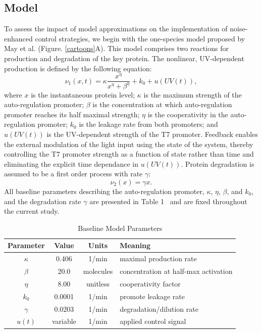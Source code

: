 \documentclass[12pt]{iopart}
\begin{document}
\subsection{Model}\label{sec:Model}
To assess the impact of model approximations on the implementation of noise-enhanced control strategies, we begin with the one-species model proposed by May et al. \cite{May2021} (Figure. \ref{cartoons}A). 
This model comprises two reactions for production and degradation of the key protein. 
The nonlinear, UV-dependent production is defined by the following equation:
\begin{equation}
\nu_1(x,t)= \kappa\frac{x^\eta}{x^\eta+\beta^\eta}+ k_0 + u(UV(t)),
\label{prodRate}
\end{equation}
where $x$ is the instantaneous protein level; $\kappa$ is the maximum strength of the auto-regulation promoter; $\beta$ is the concentration at which auto-regulation promoter reaches its half maximal strength; $\eta$ is the cooperativity in the auto-regulation promoter; $k_0$ is the leakage rate from both promoters; and $u(UV(t))$ is the UV-dependent strength of the T7 promoter. 
Feedback enables the external modulation of the light input using the state of the system, thereby controlling the T7 promoter strength as a function of state rather than time and eliminating the explicit time dependance in $u(UV(t))$.
Protein degradation is assumed to be a first order process with rate $\gamma$:
\begin{equation}
\nu_2(x) = \gamma x.
\end{equation}
All baseline parameters describing the auto-regulation promoter, $\kappa$, $\eta$, $\beta$, and $k_0$, and the degradation rate $\gamma$ are presented in Table 1~\cite{May2021} and are fixed throughout the current study.

\begin{table}[]
\caption{Baseline Model Parameters}
\begin{center}
\begin{tabular}{|c|c|c|l|}
\hline
Parameter & Value   & Units & Meaning                     \\ \hline \hline
$\kappa$         & 0.406   & 1/min & maximal production rate \\ \hline
$\beta$          & 20.0    & molecules  & concentration at half-max activation        \\  \hline
$\eta $           & 8.00    & unitless  & cooperativity factor        \\  \hline
$k_0$           & 0.0001  & 1/min & promote leakage rate \\  \hline
$\gamma$         & 0.0203  & 1/min & degradation/dilution rate         \\  \hline
$u(t)$              & variable & 1/min & applied control signal  \\ \hline
\end{tabular}
\label{table}
\end{center}
\vspace{-0.2in}
\end{table}
\end{document}
